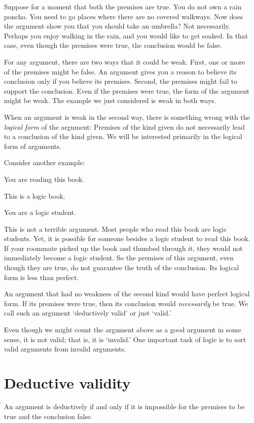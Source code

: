 Suppose for a moment that both the premises are true. You do not own a rain poncho. You need to go places where there are no covered walkways. Now does the argument show you that you should take an umbrella? Not necessarily. Perhaps you enjoy walking in the rain, and you would like to get soaked. In that case, even though the premises were true, the conclusion would be false.

For any argument, there are two ways that it could be weak. First, one or more of the premises might be false. An argument gives you a reason to believe its conclusion only if you believe its premises. Second, the premises might fail to support the conclusion. Even if the premises were true, the form of the argument might be weak. The example we just considered is weak in both ways.

When an argument is weak in the second way, there is something wrong with the \emph{logical form} of the argument: Premises of the kind given do not necessarily lead to a conclusion of the kind given. We will be interested primarily in the logical form of arguments.


Consider another example:
\begin{earg}
\item[] You are reading this book.
\item[] This is a logic book.
\item[\therefore] You are a logic student.
\end{earg}
This is not a terrible argument. Most people who read this book are logic students. Yet, it is possible for someone besides a logic student to read this book. If your roommate picked up the book and thumbed through it, they would not immediately become a logic student. So the premises of this argument, even though they are true, do not guarantee the truth of the conclusion. Its logical form is less than perfect.

An argument that had no weakness of the second kind would have perfect logical form. If its premises were true, then its conclusion would \emph{necessarily} be true. We call such an argument `deductively valid' or just `valid.'

Even though we might count the argument above as a good argument in some sense, it is not valid; that is, it is `invalid.' One important task of logic is to sort valid arguments from invalid arguments.



\section{Deductive validity}
An argument is deductively  if and only if it is impossible for the premises to be true and the conclusion false.

